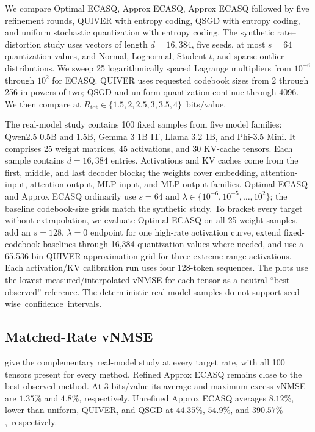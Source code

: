 \documentclass[11pt,letterpaper]{article}
\begin{document}
{We compare Optimal ECASQ, Approx ECASQ, Approx ECASQ followed by five refinement
rounds, QUIVER with entropy coding, QSGD with entropy coding, and uniform
stochastic quantization with entropy coding.  The synthetic rate--distortion
study uses vectors of length $d=16{,}384$, five seeds, at most $s=64$ quantization values,
and Normal, Lognormal, Student-$t$, and sparse-outlier distributions.  We sweep
25 logarithmically spaced Lagrange multipliers from $10^{-6}$ through $10^2$
for ECASQ.  QUIVER uses requested codebook sizes from 2 through 256 in powers
of two; QSGD and uniform quantization continue through 4096.  We then
compare at \mbox{$R_{\mathrm{tot}}\in\{1.5,2,2.5,3,3.5,4\}$ bits/value.}

The real-model study contains 100 fixed samples from five model
families: Qwen2.5 0.5B and 1.5B, Gemma 3 1B IT, Llama 3.2 1B, and Phi-3.5 Mini.
It comprises 25 weight matrices, 45 activations, and 30 KV-cache tensors.  Each
sample contains $d=16{,}384$ entries.  Activations and KV caches come from the
first, middle, and last decoder blocks; the weights cover embedding,
attention-input, attention-output, MLP-input, and MLP-output families.  Optimal
ECASQ and Approx ECASQ ordinarily use $s=64$ and
$\lambda\in\{10^{-6},10^{-5},\ldots,10^2\}$; the baseline codebook-size grids
match the synthetic study.  To bracket every target without extrapolation, we
evaluate Optimal ECASQ on all 25 weight samples, add an $s=128$, $\lambda=0$
endpoint for one high-rate activation curve, extend fixed-codebook baselines
through 16,384 quantization values where needed, and use a 65,536-bin QUIVER approximation
grid for three extreme-range activations.  Each activation/KV calibration run
uses four 128-token sequences.  The plots use the lowest
measured/interpolated vNMSE for each tensor as a neutral ``best observed''
reference.  The deterministic real-model samples do not support \mbox{seed-wise
confidence intervals.}

\subsection{Matched-Rate vNMSE}
give the complementary real-model study at every target rate, with all 100
tensors present for every method.  Refined Approx ECASQ remains close to the
best observed method.  At 3 bits/value its average and maximum excess vNMSE are
$1.35\%$ and $4.8\%$, respectively.  Unrefined Approx ECASQ averages
$8.12\%$, lower than uniform, QUIVER, and QSGD at $44.35\%$, $54.9\%$, and
\mbox{$390.57\%$, respectively.}

}
\end{document}
